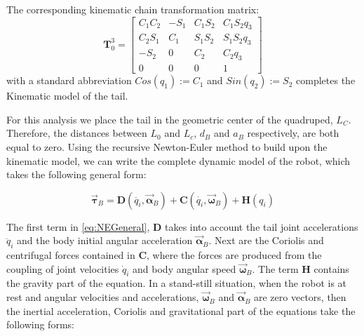 The corresponding kinematic chain transformation matrix:
\begin{equation}\label{eq:T03}
\textbf{T}_0^3=\begin{bmatrix}
C_1 C_2 & -S_1 & C_1 S_2 & C_1 S_2 q_3 \\
C_2 S_1 & C_1 & S_1 S_2 & S_1 S_2 q_3 \\
-S_2 & 0 & C_2 & C_2 q_3 \\
 0 & 0 & 0 & 1
\end{bmatrix}
\end{equation}
with a standard abbreviation $Cos(q_1):=C_1$ and $Sin(q_2):=S_2$ completes the Kinematic model of the tail. 

For this analysis we place the tail in the geometric center of the quadruped, $L_C$. Therefore, the distances between $L_0$ and $L_c$, $d_B$ and $a_B$ respectively, are both equal to zero. Using the recursive Newton-Euler method to build upon the kinematic model, we can write the complete dynamic model of the robot, which takes the following general form:

\begin{equation}\label{eq:NEGeneral}
\vec{\boldsymbol{\tau}}_B=\mathbf{D}\left ( \ddot{q_i},\vec{\boldsymbol{\alpha}}_B \right )+\mathbf{C}\left ( \dot{q_i},\vec{\boldsymbol{\omega}}_B \right )+\mathbf{H}\left ( {q_i} \right )
\end{equation}

The first term in \eqref{eq:NEGeneral}, $\mathbf{D}$ takes into account the tail joint accelerations $\ddot{q}_i$ and the body initial angular acceleration $\vec{\boldsymbol{\alpha}}_B$. Next are the Coriolis and centrifugal forces contained in $\mathbf{C}$, where the forces are produced from the coupling of joint velocities $\dot{q}_i$ and body angular speed $\vec{\boldsymbol{\omega}}_B$. The term $\mathbf{H}$ contains the gravity part of the equation. In a stand-still situation, when the robot is at rest and angular velocities and accelerations,  $\vec{\boldsymbol{\omega}}_B$ and  $\vec{\boldsymbol{\alpha}}_B$ are zero vectors, then the inertial acceleration, Coriolis and gravitational part of the equations take the following forms:
 
